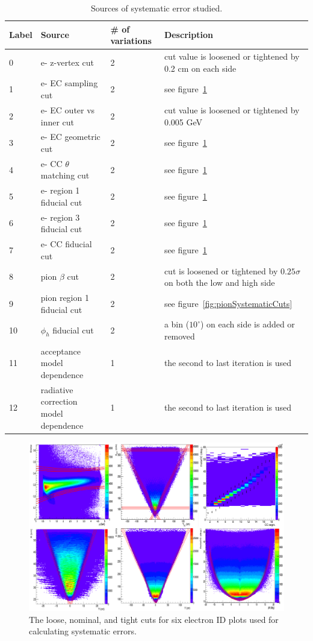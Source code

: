 \begin{table}[htp]
\centering
\begin{tabular}{ p{1.5cm} p{3cm} p{2cm} p{6cm} }
\hline
\textbf{Label} & \textbf{Source} & \textbf{\# of variations} & \textbf{Description}\\ \hline
0 & e- z-vertex cut & 2 & cut value is loosened or tightened by 0.2 cm on each side \\
1 & e- EC sampling cut & 2 & see figure~\ref{fig:eSystematicCuts} \\
2 & e- EC outer vs inner cut & 2 & cut value is loosened or tightened by 0.005 GeV \\
3 & e- EC geometric cut & 2 & see figure~\ref{fig:eSystematicCuts} \\
4 & e- CC $\theta$ matching cut & 2 & see figure~\ref{fig:eSystematicCuts} \\
5 & e- region 1 fiducial cut & 2 & see figure~\ref{fig:eSystematicCuts} \\
6 & e- region 3 fiducial cut & 2 & see figure~\ref{fig:eSystematicCuts} \\
7 & e- CC fiducial cut & 2 & see figure~\ref{fig:eSystematicCuts} \\
8 & pion $\beta$ cut & 2 & cut is loosened or tightened by $0.25\sigma$ on both the low and high side \\
9 & pion region 1 fiducial cut & 2 & see figure~\ref{fig:pionSystematicCuts} \\
10 & $\phi_h$ fiducial cut & 2 & a bin ($10^\circ$) on each side is added or removed \\
11 & acceptance model dependence & 1 & the second to last iteration is used \\
12 & radiative correction model dependence & 1 & the second to last iteration is used \\
\hline
\end{tabular}
\caption{Sources of systematic error studied.}
\label{tab:sysErrorSources}
\end{table}
%
\begin{figure}
\centering
\includegraphics[width=8.5in]{figures/eSystematicCuts.png}
\caption{The loose, nominal, and tight cuts for six electron ID plots used for calculating systematic errors.}
\label{fig:eSystematicCuts}
\end{figure}
